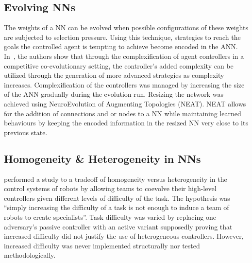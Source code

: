 \documentclass[conference]{IEEEtran}
\begin{document}
\subsection{Evolving NNs}
The weights of a NN can be evolved when possible configurations of these weights are subjected to selection pressure.
Using this technique, strategies to reach the goals the controlled agent is tempting to achieve become encoded in the ANN.
In~\cite{stanley2004competitive}, the authors show that through the complexification of agent controllers in a competitive co-evolutionary setting, the controller's added complexity can be utilized through the generation of more advanced strategies as complexity increases. 
Complexification of the controllers was managed by increasing the size of the ANN gradually during the evolution run.
Resizing the network was achieved using NeuroEvolution of Augmenting Topologies (NEAT).
NEAT allows for the addition of connections and or nodes to a NN while maintaining learned behaviours by keeping the encoded information in the resized NN very close to its previous state.

\subsection{Homogeneity \& Heterogeneity in NNs}
\cite{potter2001heterogeneity} performed a study to a tradeoff of homogeneity versus heterogeneity in the control systems of robots by allowing teams to coevolve their high-level controllers given different levels of difficulty of the task.
The hypothesis was ``simply increasing the difficulty of a task is not enough to induce a team of robots to create specialists''.
Task difficulty was varied by replacing one adversary's passive controller with an active variant supposedly proving that increased difficulty did not justify the use of heterogeneous controllers.
However, increased difficulty was never implemented structurally nor tested methodologically. 
\end{document}
